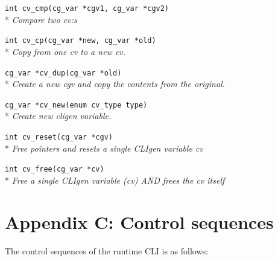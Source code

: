 \documentclass[a4paper, 10pt] {article}
\begin{document}
{{\tt int cv\_cmp(cg\_var *cgv1, cg\_var *cgv2)}\\*
\emph{ Compare two cv:s}

{\tt int cv\_cp(cg\_var *new, cg\_var *old)}\\*
\emph{ Copy from one cv to a new cv.}

{\tt cg\_var *cv\_dup(cg\_var *old)}\\*
\emph{ Create a new cgv and copy the contents from the original. }

{\tt cg\_var *cv\_new(enum cv\_type type)}\\*
\emph{ Create new cligen variable. }

{\tt int cv\_reset(cg\_var *cgv)}\\*
\emph{ Free pointers and resets a single CLIgen variable cv}

{\tt int cv\_free(cg\_var *cv)}\\*
\emph{ Free a single CLIgen variable (cv) AND frees the cv itself}

\normalsize





\newpage
\section*{Appendix C: Control sequences}
\label{app:control}
The control sequences of the runtime CLI is as follows:


}
\end{document}

